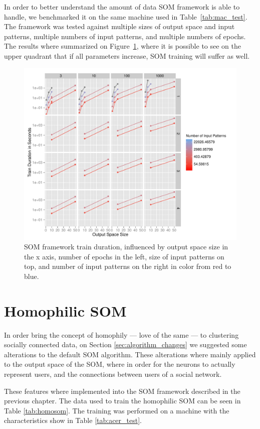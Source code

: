 In order to better understand the amount of data \ac{SOM} framework is able to handle, we benchmarked it on the same machine used in Table~\ref{tab:mac_test}. The framework was tested against multiple sizes of output space and input patterns, multiple numbers of input patterns, and multiple numbers of epochs. 
The results where summarized on Figure~\ref{fig:benchmarkingsom}, where it is possible to see on the upper quadrant that if all parameters increase, \ac{SOM} training will suffer as well.

\begin{figure}[h!]
  \centering
  \includegraphics[width=0.8\linewidth]{./plots/som/benchmarking.pdf}
  \caption{SOM framework train duration, influenced by output space size in the x axis, number of epochs in the left, size of input patterns on top, and number of input patterns on the right in color from red to blue.}
  \label{fig:benchmarkingsom}
\end{figure}


\section{Homophilic SOM}
\label{sec:homophilic_som}

In order bring the concept of homophily --- love of the same --- to clustering socially connected data, on Section \ref{sec:algorithm_changes} we suggested some alterations to the default \ac{SOM} algorithm. These alterations where mainly applied to the output space of the \ac{SOM}, where in order for the neurons to actually represent users, and the connections between users of a social network. 

These features where implemented into the \ac{SOM} framework described in the previous chapter. The data used to train the homophilic \ac{SOM} can be seen in Table \ref{tab:homosom}. The training was performed on a machine with the characteristics show in Table \ref{tab:acer_test}.

